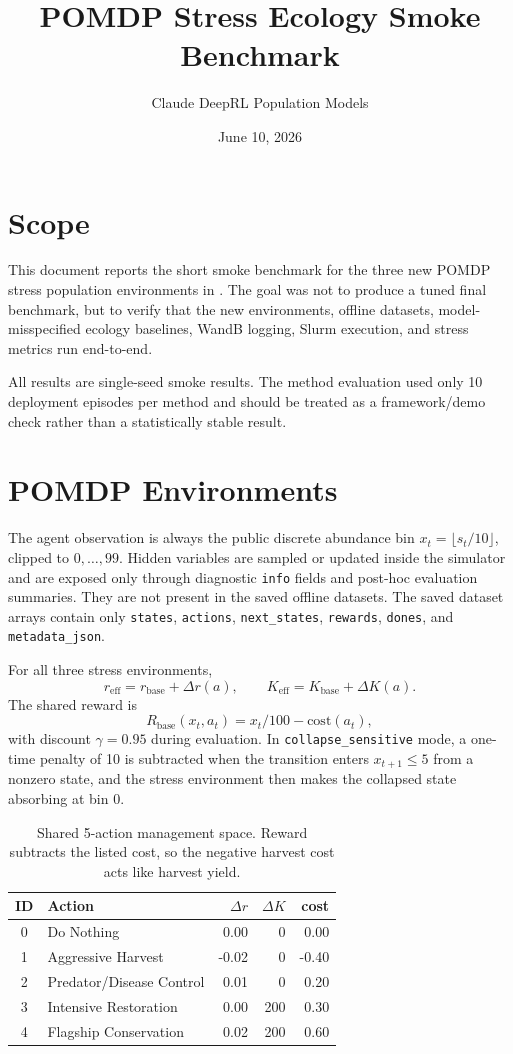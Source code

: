 \documentclass[11pt]{article}
\title{POMDP Stress Ecology Smoke Benchmark}
\author{Claude DeepRL Population Models}
\date{June 10, 2026}
\begin{document}
\maketitle

\section{Scope}

This document reports the short smoke benchmark for the three new POMDP
stress population environments in . The goal was not to
produce a tuned final benchmark, but to verify that the new environments,
offline datasets, model-misspecified ecology baselines, WandB logging, Slurm
execution, and stress metrics run end-to-end.

All results are single-seed smoke results. The method evaluation used only
10 deployment episodes per method and should be treated as a framework/demo
check rather than a statistically stable result.

\section{POMDP Environments}

The agent observation is always the public discrete abundance bin
$x_t = \lfloor s_t / 10 \rfloor$, clipped to $0,\ldots,99$. Hidden variables
are sampled or updated inside the simulator and are exposed only through
diagnostic \texttt{info} fields and post-hoc evaluation summaries. They are not
present in the saved offline datasets. The saved dataset arrays contain only
\texttt{states}, \texttt{actions}, \texttt{next\_states}, \texttt{rewards},
\texttt{dones}, and \texttt{metadata\_json}.

For all three stress environments,
\[
    r_{\mathrm{eff}} = r_{\mathrm{base}} + \Delta r(a), \qquad
    K_{\mathrm{eff}} = K_{\mathrm{base}} + \Delta K(a).
\]
The shared reward is
\[
    R_{\mathrm{base}}(x_t,a_t) = x_t/100 - \mathrm{cost}(a_t),
\]
with discount $\gamma=0.95$ during evaluation. In
\texttt{collapse\_sensitive} mode, a one-time penalty of 10 is subtracted when
the transition enters $x_{t+1}\leq 5$ from a nonzero state, and the stress
environment then makes the collapsed state absorbing at bin 0.

\begin{table}[h]
\centering
\caption{Shared 5-action management space. Reward subtracts the listed cost,
so the negative harvest cost acts like harvest yield.}
\begin{tabular}{clrrr}
\toprule
ID & Action & $\Delta r$ & $\Delta K$ & cost \\
\midrule
0 & Do Nothing & 0.00 & 0 & 0.00 \\
1 & Aggressive Harvest & -0.02 & 0 & -0.40 \\
2 & Predator/Disease Control & 0.01 & 0 & 0.20 \\
3 & Intensive Restoration & 0.00 & 200 & 0.30 \\
4 & Flagship Conservation & 0.02 & 200 & 0.60 \\
\bottomrule
\end{tabular}
\end{table}
\end{document}
